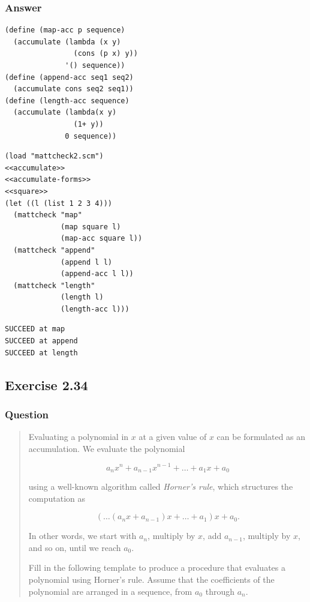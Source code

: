 \documentclass[final,fleqn,titlepage,twoside]{article}
\begin{document}
\subsubsection{Answer}
\label{sec:orga37c31d}
\begin{verbatim}
(define (map-acc p sequence)
  (accumulate (lambda (x y)
                (cons (p x) y))
              '() sequence))
(define (append-acc seq1 seq2)
  (accumulate cons seq2 seq1))
(define (length-acc sequence)
  (accumulate (lambda(x y)
                (1+ y))
              0 sequence))
\end{verbatim}
\begin{verbatim}
(load "mattcheck2.scm")
<<accumulate>>
<<accumulate-forms>>
<<square>>
(let ((l (list 1 2 3 4)))
  (mattcheck "map"
             (map square l)
             (map-acc square l))
  (mattcheck "append"
             (append l l)
             (append-acc l l))
  (mattcheck "length"
             (length l)
             (length-acc l)))
\end{verbatim}

\begin{verbatim}
SUCCEED at map
SUCCEED at append
SUCCEED at length
\end{verbatim}

\subsection{Exercise 2.34}
\label{sec:orga75d8ab}
\subsubsection{Question}
\label{sec:orgbdd2768}
\begin{quote}
Evaluating a polynomial in \(x\) at a given value of \(x\) can be formulated as
an accumulation. We evaluate the polynomial

\[ a_n x^n + a_{n-1} x^{n-1} + \dots + a_1 x + a_0 \]

using a well-known algorithm called \emph{Horner's rule}, which structures the
computation as

\[ (\dots (a_n x + a_{n-1}) x + \dots + a_1) x + a_0. \]

In other words, we start with \(a_n\), multiply by \(x\), add \(a_{n-1}\),
multiply by \(x\), and so on, until we reach \(a_0\).

Fill in the following template to produce a procedure that evaluates a
polynomial using Horner's rule. Assume that the coefficients of the polynomial
are arranged in a sequence, from \(a_0\) through \(a_n\).
\end{quote}
\end{document}
